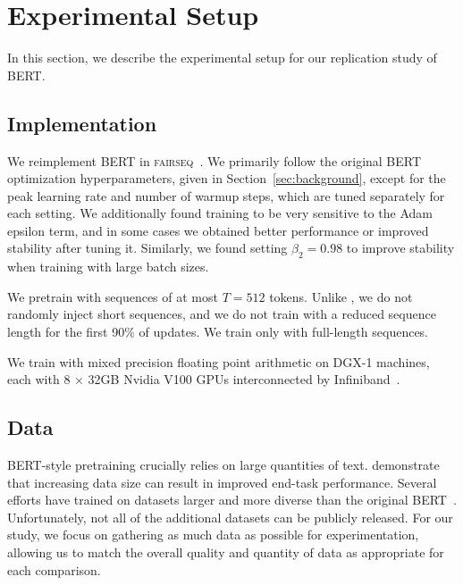 \section{Experimental Setup} \label{sec:exp}

In this section, we describe the experimental setup for our replication study of BERT.

\subsection{Implementation} \label{sec:implementation}

We reimplement BERT in \textsc{fairseq}~\cite{ott2019fairseq}.
We primarily follow the original BERT optimization hyperparameters, given in Section~\ref{sec:background}, except for the peak learning rate and number of warmup steps, which are tuned separately for each setting.
We additionally found training to be very sensitive to the Adam epsilon term, and in some cases we obtained better performance or improved stability after tuning it.
Similarly, we found setting $\beta_2 = 0.98$ to improve stability when training with large batch sizes.

We pretrain with sequences of at most $T=512$ tokens.
Unlike , we do not randomly inject short sequences, and we do not train with a reduced sequence length for the first 90\% of updates.
We train only with full-length sequences.

We train with mixed precision floating point arithmetic on DGX-1 machines, each with 8 $\times$ 32GB Nvidia V100 GPUs interconnected by Infiniband~\cite{micikevicius2018mixed}.

\subsection{Data} \label{sec:data}

BERT-style pretraining crucially relies on large quantities of text.  demonstrate that increasing data size can result in improved end-task performance. Several efforts have trained on datasets larger and more diverse than the original BERT~\cite{radford2019language,yang2019xlnet,zellers2019neuralfakenews}.
Unfortunately, not all of the additional datasets can be publicly released. For our study, we focus on gathering as much data as possible for experimentation, allowing us to match the overall quality and quantity of data as appropriate for each comparison. 

